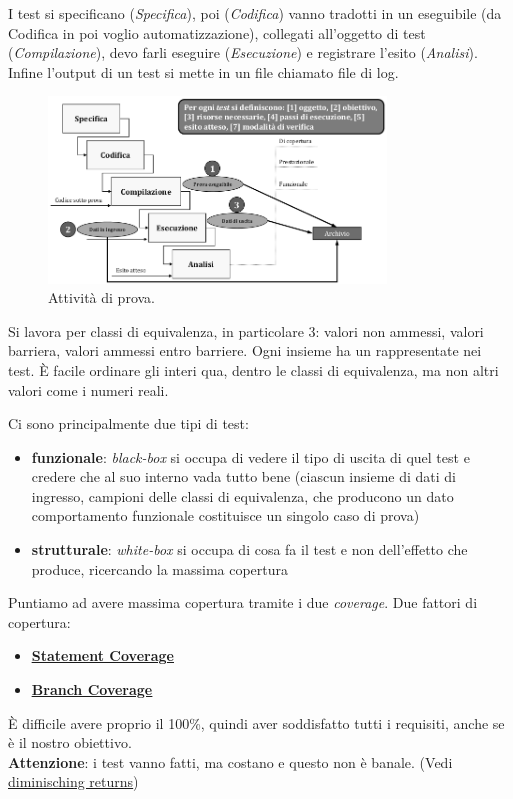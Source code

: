 		I test si specificano (\textit{Specifica}), poi (\textit{Codifica}) vanno tradotti in un eseguibile (da Codifica in poi voglio automatizzazione), collegati all'oggetto di test (\textit{Compilazione}), devo farli eseguire (\textit{Esecuzione}) e registrare l'esito (\textit{Analisi}). Infine l'output di un test si mette in un file chiamato file di log.

		\begin{figure}[H]
			\centering
			\includegraphics[width=0.8\textwidth]{img/prove}
			\caption{Attività di prova.}
		\end{figure}

		Si lavora per classi di equivalenza, in particolare 3: valori non ammessi, valori barriera, valori ammessi entro barriere. Ogni insieme ha un rappresentate nei test. È facile ordinare gli interi qua, dentro le classi di equivalenza, ma non altri valori come i numeri reali.

		Ci sono principalmente due tipi di test:
		\begin{itemize}
			\item \textbf{funzionale}: \textit{black-box} si occupa di vedere il tipo di uscita di quel test e credere che al suo interno vada tutto bene (ciascun insieme di dati di ingresso, campioni delle classi di equivalenza, che producono un dato comportamento funzionale costituisce un singolo caso di prova)
			\item \textbf{strutturale}: \textit{white-box} si occupa di cosa fa il test e non dell'effetto che produce, ricercando la massima copertura
		\end{itemize}
		Puntiamo ad avere massima copertura tramite i due \textit{coverage}.
		Due fattori di copertura: %
		\begin{itemize}
			\item \textbf{\underline{\hyperref[statementcoverage]{Statement Coverage}}}
			\item \textbf{\underline{\hyperref[branchcoverage]{Branch Coverage}}}
		\end{itemize}
		È difficile avere proprio il 100\%, quindi aver soddisfatto tutti i requisiti, anche se è il nostro obiettivo. \\
		\textbf{Attenzione}: i test vanno fatti, ma costano e questo non è banale. (Vedi \underline{\hyperref[diminishingreturn]{diminisching returns}})


